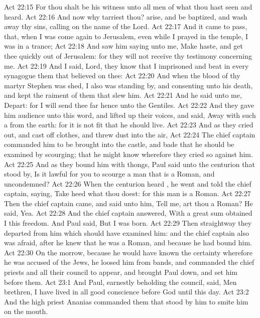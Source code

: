 \vs Act 22:15 For thou shalt be his witness unto all men of what thou hast seen and heard.
\vs Act 22:16 And now why tarriest thou? arise, and be baptized, and wash away thy sins, calling on the name of the Lord.
\vs Act 22:17 And it came to pass, that, when I was come again to Jerusalem, even while I prayed in the temple, I was in a trance;
\vs Act 22:18 And saw him saying unto me, Make haste, and get thee quickly out of Jerusalem: for they will not receive thy testimony concerning me.
\vs Act 22:19 And I said, Lord, they know that I imprisoned and beat in every synagogue them that believed on thee:
\vs Act 22:20 And when the blood of thy martyr Stephen was shed, I also was standing by, and consenting unto his death, and kept the raiment of them that slew him.
\vs Act 22:21 And he said unto me, Depart: for I will send thee far hence unto the Gentiles.
\vs Act 22:22 And they gave him audience unto this word, and  lifted up their voices, and said, Away with such a  from the earth: for it is not fit that he should live.
\vs Act 22:23 And as they cried out, and cast off  clothes, and threw dust into the air,
\vs Act 22:24 The chief captain commanded him to be brought into the castle, and bade that he should be examined by scourging; that he might know wherefore they cried so against him.
\vs Act 22:25 And as they bound him with thongs, Paul said unto the centurion that stood by, Is it lawful for you to scourge a man that is a Roman, and uncondemned?
\vs Act 22:26 When the centurion heard , he went and told the chief captain, saying, Take heed what thou doest: for this man is a Roman.
\vs Act 22:27 Then the chief captain came, and said unto him, Tell me, art thou a Roman? He said, Yea.
\vs Act 22:28 And the chief captain answered, With a great sum obtained I this freedom. And Paul said, But I was  born.
\vs Act 22:29 Then straightway they departed from him which should have examined him: and the chief captain also was afraid, after he knew that he was a Roman, and because he had bound him.
\vs Act 22:30 On the morrow, because he would have known the certainty wherefore he was accused of the Jews, he loosed him from  bands, and commanded the chief priests and all their council to appear, and brought Paul down, and set him before them.
\vs Act 23:1 And Paul, earnestly beholding the council, said, Men  brethren, I have lived in all good conscience before God until this day.
\vs Act 23:2 And the high priest Ananias commanded them that stood by him to smite him on the mouth.
